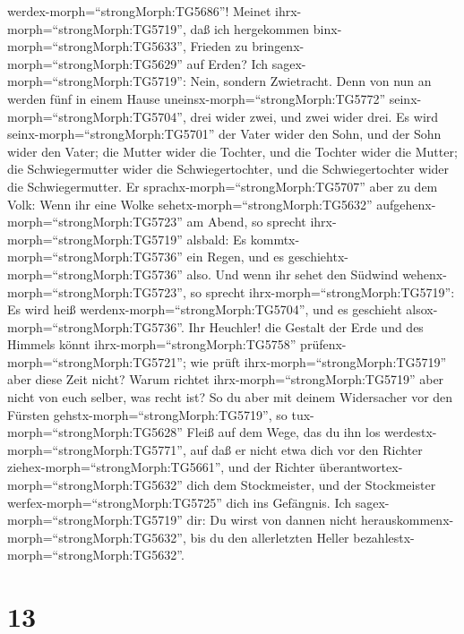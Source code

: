 werdex-morph=``strongMorph:TG5686''!  Meinet
ihrx-morph=``strongMorph:TG5719'', daß ich hergekommen
binx-morph=``strongMorph:TG5633'', Frieden zu
bringenx-morph=``strongMorph:TG5629'' auf Erden? Ich
sagex-morph=``strongMorph:TG5719'': Nein, sondern Zwietracht.
 Denn von nun an werden fünf in einem Hause
uneinsx-morph=``strongMorph:TG5772'' seinx-morph=``strongMorph:TG5704'',
drei wider zwei, und zwei wider drei.  Es wird
seinx-morph=``strongMorph:TG5701'' der Vater wider den Sohn, und der
Sohn wider den Vater; die Mutter wider die Tochter, und die Tochter
wider die Mutter; die Schwiegermutter wider die Schwiegertochter, und
die Schwiegertochter wider die Schwiegermutter.  Er
sprachx-morph=``strongMorph:TG5707'' aber zu dem Volk: Wenn ihr eine
Wolke sehetx-morph=``strongMorph:TG5632''
aufgehenx-morph=``strongMorph:TG5723'' am Abend, so sprecht
ihrx-morph=``strongMorph:TG5719'' alsbald: Es
kommtx-morph=``strongMorph:TG5736'' ein Regen, und es
geschiehtx-morph=``strongMorph:TG5736'' also.  Und wenn ihr
sehet den Südwind wehenx-morph=``strongMorph:TG5723'', so sprecht
ihrx-morph=``strongMorph:TG5719'': Es wird heiß
werdenx-morph=``strongMorph:TG5704'', und es geschieht
alsox-morph=``strongMorph:TG5736''.  Ihr Heuchler! die
Gestalt der Erde und des Himmels könnt ihrx-morph=``strongMorph:TG5758''
prüfenx-morph=``strongMorph:TG5721''; wie prüft
ihrx-morph=``strongMorph:TG5719'' aber diese Zeit nicht? 
Warum richtet ihrx-morph=``strongMorph:TG5719'' aber nicht von euch
selber, was recht ist?  So du aber mit deinem Widersacher
vor den Fürsten gehstx-morph=``strongMorph:TG5719'', so
tux-morph=``strongMorph:TG5628'' Fleiß auf dem Wege, das du ihn los
werdestx-morph=``strongMorph:TG5771'', auf daß er nicht etwa dich vor
den Richter ziehex-morph=``strongMorph:TG5661'', und der Richter
überantwortex-morph=``strongMorph:TG5632'' dich dem Stockmeister, und
der Stockmeister werfex-morph=``strongMorph:TG5725'' dich ins Gefängnis.
 Ich sagex-morph=``strongMorph:TG5719'' dir: Du wirst von
dannen nicht herauskommenx-morph=``strongMorph:TG5632'', bis du den
allerletzten Heller bezahlestx-morph=``strongMorph:TG5632''.

\hypertarget{section-12}{%
\section{13}\label{section-12}}

